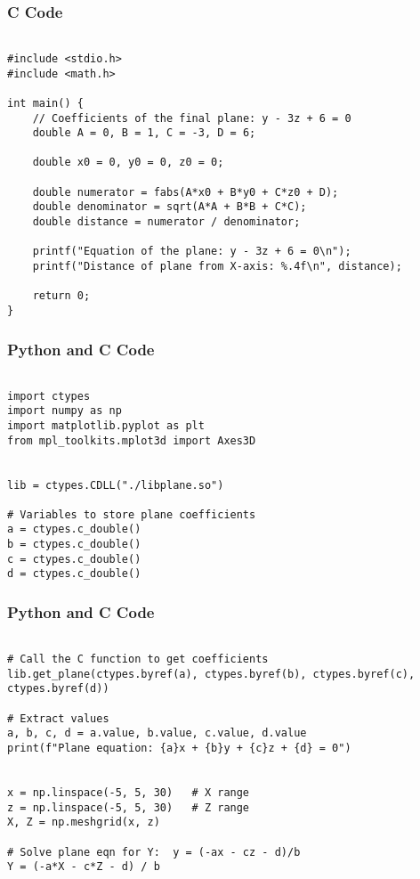 \documentclass{beamer}
\begin{document}
\begin{frame}[fragile]
\frametitle{ C Code}

\begin{lstlisting}

#include <stdio.h>
#include <math.h>

int main() {
    // Coefficients of the final plane: y - 3z + 6 = 0
    double A = 0, B = 1, C = -3, D = 6;

    double x0 = 0, y0 = 0, z0 = 0;

    double numerator = fabs(A*x0 + B*y0 + C*z0 + D);
    double denominator = sqrt(A*A + B*B + C*C);
    double distance = numerator / denominator;

    printf("Equation of the plane: y - 3z + 6 = 0\n");
    printf("Distance of plane from X-axis: %.4f\n", distance);

    return 0;
}
\end{lstlisting}

\end{frame}


\begin{frame}[fragile]
\frametitle{Python and C Code}

\begin{lstlisting}

import ctypes
import numpy as np
import matplotlib.pyplot as plt
from mpl_toolkits.mplot3d import Axes3D


lib = ctypes.CDLL("./libplane.so")

# Variables to store plane coefficients
a = ctypes.c_double()
b = ctypes.c_double()
c = ctypes.c_double()
d = ctypes.c_double()
\end{lstlisting}

\end{frame}

\begin{frame}[fragile]
\frametitle{Python and C Code}

\begin{lstlisting}

# Call the C function to get coefficients
lib.get_plane(ctypes.byref(a), ctypes.byref(b), ctypes.byref(c), ctypes.byref(d))

# Extract values
a, b, c, d = a.value, b.value, c.value, d.value
print(f"Plane equation: {a}x + {b}y + {c}z + {d} = 0")


x = np.linspace(-5, 5, 30)   # X range
z = np.linspace(-5, 5, 30)   # Z range
X, Z = np.meshgrid(x, z)

# Solve plane eqn for Y:  y = (-ax - cz - d)/b
Y = (-a*X - c*Z - d) / b

\end{lstlisting}

\end{frame}
\end{document}
